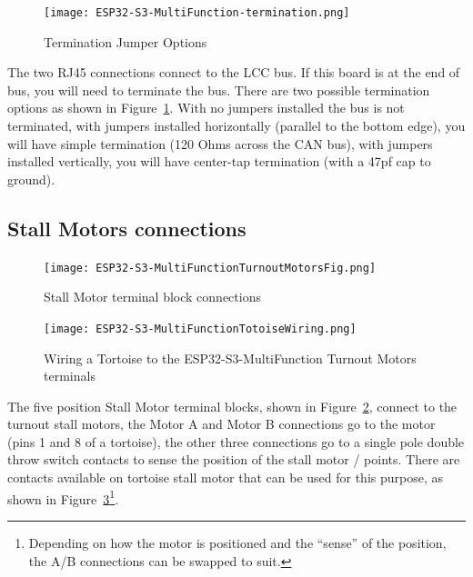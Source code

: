 \begin{figure}[hbpt]\begin{centering}%
\texttt{[image: ESP32-S3-MultiFunction-termination.png]}
\caption{Termination Jumper Options}
\label{fig:ESP32-S3-MultiFunction-termination}
\end{centering}\end{figure}
The two RJ45 connections connect to the LCC bus.  If this board is at the end 
of bus, you will need to terminate the bus.  There are two possible 
termination options as shown in 
Figure~\ref{fig:ESP32-S3-MultiFunction-termination}.  With no jumpers 
installed the bus is not terminated, with jumpers installed horizontally 
(parallel to the bottom edge), you will have simple termination (120 Ohms 
across the CAN bus), with jumpers installed vertically, you will have 
center-tap termination (with a 47pf cap to ground).

\subsection{Stall Motors connections}
\label{sec:StallMotorsconnections}
\begin{figure}[hbpt]\begin{centering}%
\texttt{[image: ESP32-S3-MultiFunctionTurnoutMotorsFig.png]}
\caption{Stall Motor terminal block connections}
\label{fig:ESP32-S3-MultiFunctionTurnoutMotorsFig}
\end{centering}\end{figure}
\begin{figure}[hbpt]\begin{centering}%
\texttt{[image: ESP32-S3-MultiFunctionTotoiseWiring.png]}
\caption{Wiring a Tortoise to the ESP32-S3-MultiFunction Turnout Motors terminals}
\label{fig:ESP32-S3-MultiFunctionTotoiseWiring}
\end{centering}\end{figure}

The five position Stall Motor terminal blocks, shown in 
Figure~\ref{fig:ESP32-S3-MultiFunctionTurnoutMotorsFig}, connect to the 
turnout stall motors, the Motor A and Motor B connections go to the motor 
(pins 1 and 8 of a tortoise), the other three connections go to a single pole 
double throw switch contacts to sense the position of the stall motor / 
points. There are contacts available on tortoise stall motor that can be used 
for this purpose, as shown in 
Figure~\ref{fig:ESP32-S3-MultiFunctionTotoiseWiring}\footnote{Depending on how 
the motor is positioned and the ``sense'' of the position, the A/B connections 
can be swapped to suit.}.

